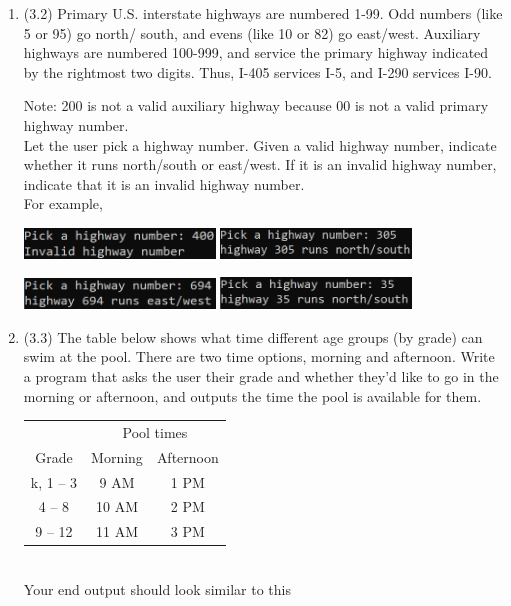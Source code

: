 \documentclass{article}
\begin{document}
\begin{enumerate}

\item (3.2)  
		Primary U.S. interstate highways are numbered 1-99.  Odd numbers (like 5 or 95) go north/
		south, and evens (like 10 or 82) go east/west.  Auxiliary highways are numbered 100-999, and 
		service the primary highway indicated by the rightmost two digits.  Thus, I-405 services 
		I-5, and I-290 services I-90.
		
		Note: 200 is not a valid auxiliary highway because 00 is not a valid primary highway 
		number.\\
		
		Let the user pick a highway number.  Given a valid highway number, indicate whether it runs 
		north/south or east/west.  If it is an invalid highway number, indicate that it is an 
		invalid highway number. \\
		For example,
		
		\hfill
		\includegraphics[width = 2in]{./imgs/highwayValidator1.PNG} \hfill
		\includegraphics[width = 2in]{./imgs/highwayValidator2.PNG} \hfill \ 

		\hfill 
		\includegraphics[width = 2in]{./imgs/highwayValidator3.PNG} \hfill 
		\includegraphics[width = 2in]{./imgs/highwayValidator4.PNG} \hfill \ 



\item (3.3)  
		The table below shows what time different age groups (by grade) can swim at the pool.  There 
		are two time options, morning and afternoon.  Write a program that asks the user their grade 
		and whether they'd like to go in the morning or afternoon, and outputs the time the pool is 
		available for them.

		\begin{minipage}{.45\textwidth}
		\begin{tabular}{c|cc}
						& \multicolumn{2}{c}{Pool times}\\
			Grade 		& Morning 	& Afternoon \\ \hline
			k, 1 -- 3 	& 9 AM 		& 1 PM\\
			4 -- 8 		& 10 AM 	& 2 PM\\
			9 -- 12 	& 11 AM 	& 3 PM \\
		\end{tabular}
		\end{minipage}
		\begin{minipage}{.45\textwidth}
			\ \\
			Your end output should look similar to this


\end{minipage}
\end{enumerate}
\end{document}

